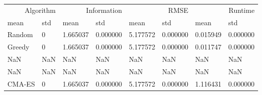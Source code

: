 \begin{tabular}{llllllll}
\toprule
\multicolumn{2}{r}{Algorithm} & \multicolumn{2}{r}{Information} & \multicolumn{2}{r}{RMSE} & \multicolumn{2}{r}{Runtime} \\
mean & std & mean & std & mean & std & mean & std \\
\midrule
Random & 0 & 1.665037 & 0.000000 & 5.177572 & 0.000000 & 0.015949 & 0.000000 \\
Greedy & 0 & 1.665037 & 0.000000 & 5.177572 & 0.000000 & 0.011747 & 0.000000 \\
NaN & NaN & NaN & NaN & NaN & NaN & NaN & NaN \\
NaN & NaN & NaN & NaN & NaN & NaN & NaN & NaN \\
CMA-ES & 0 & 1.665037 & 0.000000 & 5.177572 & 0.000000 & 1.116431 & 0.000000 \\
\bottomrule
\end{tabular}
